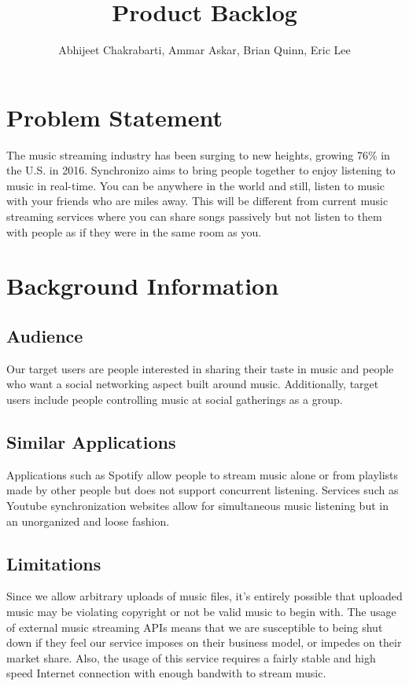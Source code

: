 \documentclass{article}
\title{Product Backlog}
\author{Abhijeet Chakrabarti, Ammar Askar, Brian Quinn, Eric Lee}
\begin{document}
\maketitle

\section{Problem Statement}
The music streaming industry has been surging to new heights, growing 76\% in the U.S. in 2016. Synchronizo aims to bring people together to enjoy listening to music in real-time. You can be anywhere in the world and still, listen to music with your friends who are miles away. This will be different from current music streaming services where you can share songs passively but not listen to them with people as if they were in the same room as you.

\section{Background Information}

\subsection{Audience}
Our target users are people interested in sharing their taste in music and people who want a social networking aspect built around music. Additionally, target users include people controlling music at social gatherings as a group.

\subsection{Similar Applications}
Applications such as Spotify allow people to stream music alone or from playlists made by other people but does not support concurrent listening. Services such as Youtube synchronization websites allow for simultaneous music listening but in an unorganized and loose fashion.

\subsection{Limitations}
Since we allow arbitrary uploads of music files, it's entirely possible that uploaded music may be violating copyright or not be valid music to begin with. The usage of external music streaming APIs means that we are susceptible to being shut down if they feel our service imposes on their business model, or impedes on their market share. Also, the usage of this service requires a fairly stable and high speed Internet connection with enough bandwith to stream music.
\end{document}
